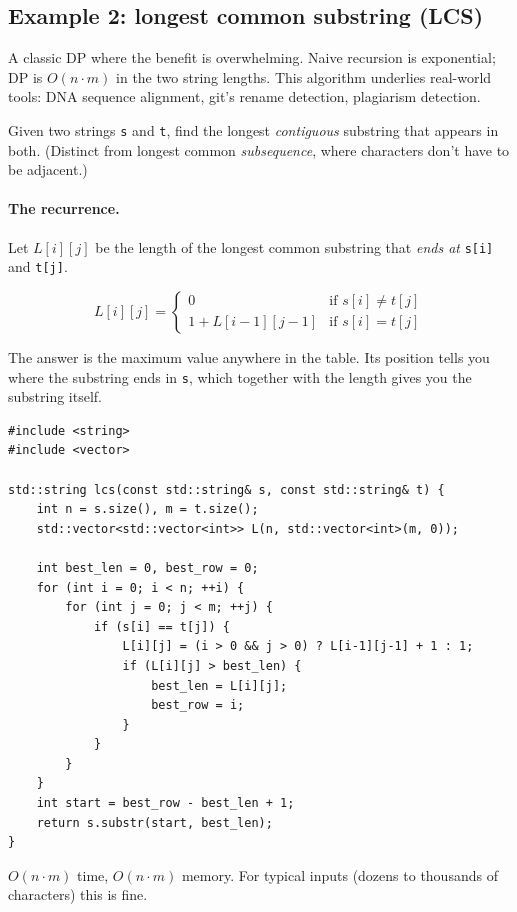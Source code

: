 \documentclass[11pt]{article}
\begin{document}
\subsection{Example 2: longest common substring (LCS)}

A classic DP where the benefit is overwhelming. Naive recursion is
exponential; DP is $O(n \cdot m)$ in the two string lengths. This
algorithm underlies real-world tools: DNA sequence alignment, git's
rename detection, plagiarism detection.

\begin{defnbox}
Given two strings \texttt{s} and \texttt{t}, find the longest
\emph{contiguous} substring that appears in both. (Distinct from
longest common \emph{subsequence}, where characters don't have to be
adjacent.)
\end{defnbox}

\paragraph{The recurrence.} Let $L[i][j]$ be the length of the
longest common substring that \emph{ends at} \texttt{s[i]} and
\texttt{t[j]}.

\[
L[i][j] = \begin{cases}
0 & \text{if } s[i] \ne t[j] \\
1 + L[i-1][j-1] & \text{if } s[i] = t[j]
\end{cases}
\]

The answer is the maximum value anywhere in the table. Its position
tells you where the substring ends in \texttt{s}, which together with
the length gives you the substring itself.

\begin{examplebox}
\begin{verbatim}
#include <string>
#include <vector>

std::string lcs(const std::string& s, const std::string& t) {
    int n = s.size(), m = t.size();
    std::vector<std::vector<int>> L(n, std::vector<int>(m, 0));

    int best_len = 0, best_row = 0;
    for (int i = 0; i < n; ++i) {
        for (int j = 0; j < m; ++j) {
            if (s[i] == t[j]) {
                L[i][j] = (i > 0 && j > 0) ? L[i-1][j-1] + 1 : 1;
                if (L[i][j] > best_len) {
                    best_len = L[i][j];
                    best_row = i;
                }
            }
        }
    }
    int start = best_row - best_len + 1;
    return s.substr(start, best_len);
}
\end{verbatim}
$O(n \cdot m)$ time, $O(n \cdot m)$ memory. For typical inputs
(dozens to thousands of characters) this is fine.
\end{examplebox}
\end{document}
